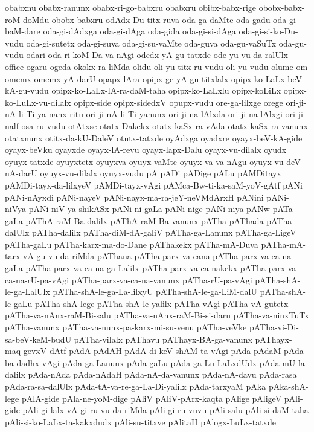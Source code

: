 {obabxnu
obabx-ranunx
obabx-ri-go-babxru
obabxru
obibx-babx-rige
obobx-babx-roM-doMdu
obobx-babxru
odAdx-Du-titx-ruva
oda-ga-daMte
oda-gadu
oda-gi-baM-dare
oda-gi-dAdxga
oda-gi-dAga
oda-gida
oda-gi-si-dAga
oda-gi-si-ko-Du-vudu
oda-gi-sutetx
oda-gi-suva
oda-gi-su-vaMte
oda-guva
oda-gu-vaSuTx
oda-gu-vudu
odari
oda-ri-koM-Da-va-nAgi
odedx-yA-gu-tatxde
ode-yu-vu-da-ralUlx
office
ogaru
ogeda
okokx-ra-liMda
olidu
oli-yu-titx-ru-vudu
oli-yu-vudu
olume
om
omemx
omemx-yA-darU
opapx-lAra
opipx-ge-yA-gu-titxlalx
opipx-ko-LaLx-beV-kA-gu-vudu
opipx-ko-LaLx-lA-ra-daM-taha
opipx-ko-LaLxlu
opipx-koLiLx
opipx-ko-LuLx-vu-dilalx
opipx-side
opipx-sidedxV
opupx-vudu
ore-ga-lilxge
orege
ori-ji-nA-li-Ti-ya-nanx-ritu
ori-ji-nA-li-Ti-yanunx
ori-ji-na-lAlxda
ori-ji-na-lAlxgi
ori-ji-nalf
osa-ru-vudu
otAtxse
otatx-Dakekx
otatx-kaSx-ra-vAda
otatx-kaSx-ra-vanunx
otatxnunx
otitx-da-kU-DaleV
otutx-tatxde
oyAdxga
oyadxre
oyayx-beV-kA-gide
oyayx-beVku
oyayxde
oyayx-lA-revu
oyayx-lapx-Dalu
oyayx-vu-dilalx
oyudx
oyuyx-tatxde
oyuyxtetx
oyuyxva
oyuyx-vaMte
oyuyx-va-va-nAgu
oyuyx-vu-deV-nA-darU
oyuyx-vu-dilalx
oyuyx-vudu
pA
pADi
pADige
pALu
pAMDitayx
pAMDi-tayx-da-lilxyeV
pAMDi-tayx-vAgi
pAMca-Bw-ti-ka-saM-yoV-gAtf
pANi
pANi-nAyxdi
pANi-nayeV
pANi-nayx-ma-ra-jeY-neVMdArxH
pANini
pANi-niVya
pANi-niV-ya-shikASx
pANi-ni-gaLa
pANi-nige
pANi-niya
pANw
pATa-gaLa
pAThA-raM-Ba-dalilx
pAThA-raM-Ba-vanunx
pATha
pAThada
pATha-dalUlx
pATha-dalilx
pATha-diM-dA-galiV
pATha-ga-Lanunx
pATha-ga-LigeV
pATha-gaLu
pATha-karx-ma-do-Dane
pAThakekx
pATha-mA-Duva
pATha-mA-tarx-vA-gu-vu-da-riMda
pAThana
pATha-parx-va-cana
pATha-parx-va-ca-na-gaLa
pATha-parx-va-ca-na-ga-Lalilx
pATha-parx-va-ca-nakekx
pATha-parx-va-ca-na-rU-pa-vAgi
pATha-parx-va-ca-na-vanunx
pATha-rU-pa-vAgi
pATha-shA-le-ga-LalUlx
pATha-shA-le-ga-La-lilxyU
pATha-shA-le-ga-LiM-dalU
pATha-shA-le-gaLu
pATha-shA-lege
pATha-shA-le-yalilx
pATha-vAgi
pATha-vA-gutetx
pATha-va-nAnx-raM-Bi-salu
pATha-va-nAnx-raM-Bi-si-daru
pATha-va-ninxTuTx
pATha-vanunx
pATha-va-nunx-pa-karx-mi-su-venu
pATha-veVke
pATha-vi-Di-sa-beV-keM-budU
pATha-vilalx
pAThavu
pAThayx-BA-ga-vanunx
pAThayx-maq-gevxV-dAtf
pAdA
pAdAH
pAdA-di-keV-shAM-ta-vAgi
pAda
pAdaM
pAda-ba-dadhx-vAgi
pAda-ga-Lanunx
pAda-gaLu
pAda-ga-Lu-LaLxdUdx
pAda-mU-la-dalilx
pAda-nAda
pAda-nAdaH
pAda-nA-da-vanunx
pAda-nA-davu
pAda-rasa
pAda-ra-sa-dalUlx
pAda-tA-va-re-ga-La-Di-yalilx
pAda-tarxyaM
pAka
pAka-shA-lege
pAlA-gide
pAla-ne-yoM-dige
pAliV
pAliV-pArx-kaqta
pAlige
pAligeV
pAli-gide
pAli-gi-lalx-vA-gi-ru-vu-da-riMda
pAli-gi-ru-vuvu
pAli-salu
pAli-si-daM-taha
pAli-si-ko-LaLx-ta-kakxdudx
pAli-su-titxve
pAlitaH
pAlogx-LuLx-tatxde
}
